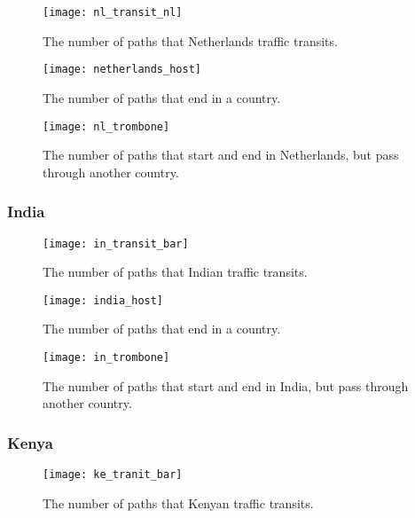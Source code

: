 \begin{figure}
\centering
\texttt{[image: nl\_transit\_nl]}
\caption{The number of paths that Netherlands traffic transits.}
\label{fig:transit}
\end{figure}

\begin{figure}[t!]
\centering
\texttt{[image: netherlands\_host]}
\caption{The number of paths that end in a country.}
\label{fig:host}
\end{figure} 

\begin{figure}
\centering
\texttt{[image: nl\_trombone]}
\caption{The number of paths that start and end in Netherlands, but pass through another country.}
\label{fig:trombone}
\end{figure}

\subsubsection{India}

\begin{figure}
\centering
\texttt{[image: in\_transit\_bar]}
\caption{The number of paths that Indian traffic transits.}
\label{fig:transit}
\end{figure}

\begin{figure}[t!]
\centering
\texttt{[image: india\_host]}
\caption{The number of paths that end in a country.}
\label{fig:host}
\end{figure} 

\begin{figure}
\centering
\texttt{[image: in\_trombone]}
\caption{The number of paths that start and end in India, but pass through another country.}
\label{fig:trombone}
\end{figure}

\subsubsection{Kenya}

\begin{figure}
\centering
\texttt{[image: ke\_tranit\_bar]}
\caption{The number of paths that Kenyan traffic transits.}
\label{fig:transit}
\end{figure}

